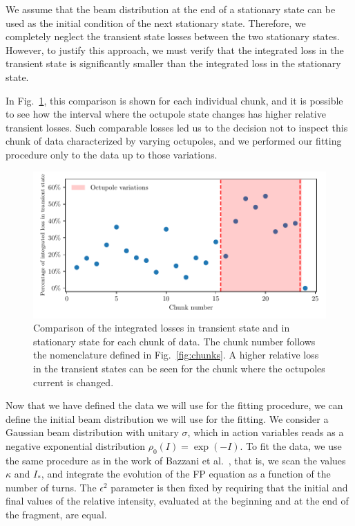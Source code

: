 We assume that the beam distribution at the end of a stationary state can be used as the initial condition of the next stationary state. Therefore, we completely neglect the transient state losses between the two stationary states. However, to justify this approach, we must verify that the integrated loss in the transient state is significantly smaller than the integrated loss in the stationary state.

In Fig.~\ref{fig:wire_loss_comp}, this comparison is shown for each individual chunk, and it is possible to see how the interval where the octupole state changes has higher relative transient losses. Such comparable losses led us to the decision not to inspect this chunk of data characterized by varying octupoles, and we performed our fitting procedure only to the data up to those variations.

\begin{figure}[hpt]
    \centering
    \includegraphics[width=1.0\textwidth]{5_wire_compensators_LHC/figs/losses_comparison.pdf}
    \caption{Comparison of the integrated losses in transient state and in stationary state for each chunk of data. The chunk number follows the nomenclature defined in Fig.~\ref{fig:chunks}. A higher relative loss in the transient states can be seen for the chunk where the octupoles current is changed.}
    \label{fig:wire_loss_comp}
\end{figure}

Now that we have defined the data we will use for the fitting procedure, we can define the initial beam distribution we will use for the fitting. We consider a Gaussian beam distribution with unitary $\sigma$, which in action variables reads as a negative exponential distribution $\rho_0(I) = \exp(-I)$. To fit the data, we use the same procedure as in the work of Bazzani et al.~\cite{bazzani2020diffusion}, that is, we scan the values $\kappa$ and $I_\ast$, and integrate the evolution of the FP equation as a function of the number of turns. The $\epsilon^2$ parameter is then fixed by requiring that the initial and final values of the relative intensity, evaluated at the beginning and at the end of the fragment, are equal.

